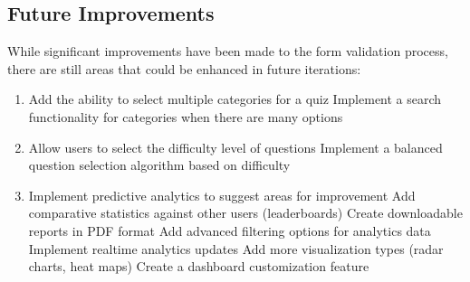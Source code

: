 \documentclass[letterpaper,10pt,english]{sphinxmanual}
\begin{document}
\subsection{Future Improvements}
\label{\detokenize{improvements:future-improvements}}
\sphinxAtStartPar
While significant improvements have been made to the form validation process, there are still areas that could be enhanced in future iterations:
\begin{enumerate}
%
\item {} 
\sphinxAtStartPar
{}
\sphinxhyphen{} Add the ability to select multiple categories for a quiz
\sphinxhyphen{} Implement a search functionality for categories when there are many options

\item {} 
\sphinxAtStartPar
{}
\sphinxhyphen{} Allow users to select the difficulty level of questions
\sphinxhyphen{} Implement a balanced question selection algorithm based on difficulty

\item {} 
\sphinxAtStartPar
{}
\sphinxhyphen{} Implement predictive analytics to suggest areas for improvement
\sphinxhyphen{} Add comparative statistics against other users (leaderboards)
\sphinxhyphen{} Create downloadable reports in PDF format
\sphinxhyphen{} Add advanced filtering options for analytics data
\sphinxhyphen{} Implement real\sphinxhyphen{}time analytics updates
\sphinxhyphen{} Add more visualization types (radar charts, heat maps)
\sphinxhyphen{} Create a dashboard customization feature

\begin{sphinxVerbatim}[commandchars=\\\{\}]
 
      

     
          
          


\end{sphinxVerbatim}
\end{enumerate}
\end{document}
